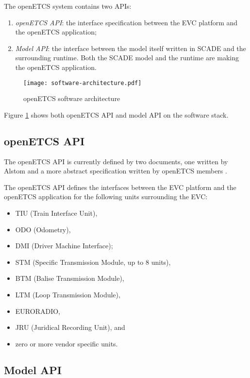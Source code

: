 
The openETCS system contains two APIs:
\begin{enumerate}
\item \emph{openETCS API}: the interface specification between the
EVC platform and the openETCS application;
\item \emph{Model API}: the interface between the model itself written in
SCADE and the surrounding runtime. Both the SCADE model and the
runtime are making the openETCS application.
\end{enumerate}

\begin{figure}[h]
\centering
\texttt{[image: software-architecture.pdf]}
\caption{openETCS software architecture}
\label{fig:software-architecture}
\end{figure}

Figure \ref{fig:software-architecture} shows both openETCS API and
model API on the software stack.

\subsection{openETCS API}

The openETCS API is currently defined by two documents, one written by
Alstom \cite{alstom-api} and a more abstract specification written by
openETCS members \cite{openetcs-api}.

The openETCS API defines the interfaces between the EVC platform and
the openETCS application for the following units surrounding the EVC:
\begin{itemize}
\item TIU (Train Interface Unit),
\item ODO (Odometry),
\item DMI (Driver Machine Interface);
\item STM (Specific Transmission Module, up to 8 units),
\item BTM (Balise Transmission Module),
\item LTM (Loop Transmission Module),
\item EURORADIO,
\item JRU (Juridical Recording Unit), and
\item zero or more vendor specific units.
\end{itemize}


\subsection{Model API}

